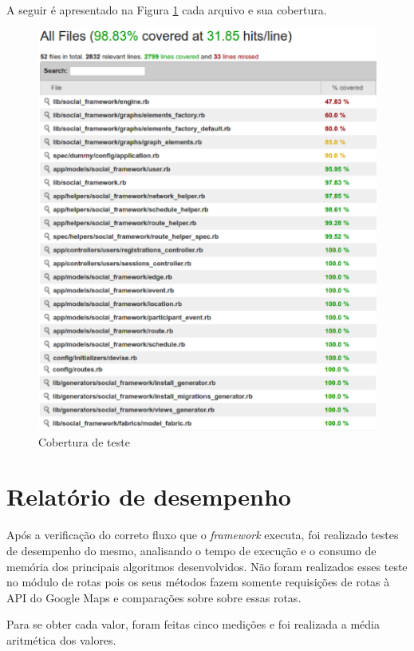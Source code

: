 A seguir é apresentado na Figura \ref{Cobertura_teste} cada arquivo e sua cobertura.

\begin{figure}[!h]
	\centering
	\includegraphics[scale=0.60]{figuras/capitulo5/cobertura.eps}
	\caption[Cobertura de teste]{Cobertura de teste}
	\label{Cobertura_teste}
\end{figure}

\section{Relatório de desempenho}

Após a verificação do correto fluxo que o \textit{framework} executa, foi realizado testes de desempenho do mesmo, analisando o tempo de execução e o consumo de memória dos principais algoritmos desenvolvidos. Não foram realizados esses teste no módulo de rotas pois os seus métodos fazem somente requisições de rotas à API do Google Maps e comparações sobre sobre essas rotas.

Para se obter cada valor, foram feitas cinco medições e foi realizada a média aritmética dos valores.

